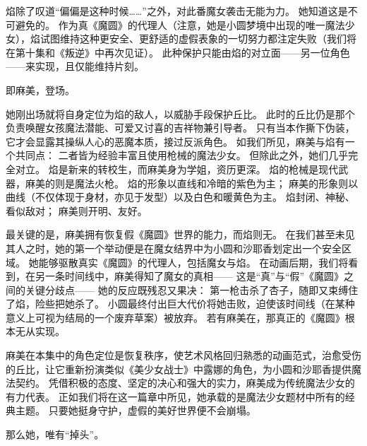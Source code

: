焰除了叹道“偏偏是这种时候……”之外，对此番魔女袭击无能为力。
她知道这是不可避免的。
作为真《魔圆》的代理人（注意，她是小圆梦境中出现的唯一魔法少女），焰试图维持这种更安全、更舒适的虚假表象的一切努力都注定失败（我们将在第十集和《叛逆》中再次见证）。
此种保护只能由焰的对立面——另一位角色——来实现，且仅能维持片刻。

即麻美，登场。

她刚出场就将自身定位为焰的敌人，以威胁手段保护丘比。
此时的丘比仍是那个负责唤醒女孩魔法潜能、可爱又讨喜的吉祥物兼引导者。
只有当本作撕下伪装，它才会显露其操纵人心的恶魔本质，接过反派角色。
如我们所见，麻美与焰有一个共同点：
二者皆为经验丰富且使用枪械的魔法少女。
但除此之外，她们几乎完全对立。
焰是新来的转校生，而麻美身为学姐，资历更深。
焰的枪械是现代武器，麻美的则是魔法火枪。
焰的形象以直线和冷暗的紫色为主；
麻美的形象则以曲线（不仅体现于身材，亦见于发型）以及白色和暖黄色为主。
焰封闭、神秘、看似敌对；
麻美则开明、友好。

最关键的是，麻美拥有恢复假《魔圆》世界的能力，而焰则无。
在我们甚至未见其人之时，她的第一个举动便是在魔女结界中为小圆和沙耶香划定出一个安全区域。
她能够驱散真实《魔圆》的代理人，包括魔女与焰。
在动画后期，我们将看到，在另一条时间线中，麻美得知了魔女的真相——
这是“真”与“假”《魔圆》之间的关键分歧点——
她的反应既残忍又果决：
第一枪击杀了杏子，随即又束缚住了焰，险些把她杀了。
小圆最终付出巨大代价将她击败，迫使该时间线（在某种意义上可视为结局的一个废弃草案）被放弃。
若有麻美在，那真正的《魔圆》根本无从实现。

麻美在本集中的角色定位是恢复秩序，使艺术风格回归熟悉的动画范式，治愈受伤的丘比，让它重新扮演类似《美少女战士》中露娜的角色，为小圆和沙耶香提供魔法契约。
凭借积极的态度、坚定的决心和强大的实力，麻美成为传统魔法少女的有力代表。
正如我们将在这一篇章中所见，她承载的是魔法少女题材中所有的经典主题。
只要她挺身守护，虚假的美好世界便不会崩塌。

那么她，唯有“掉头”。
